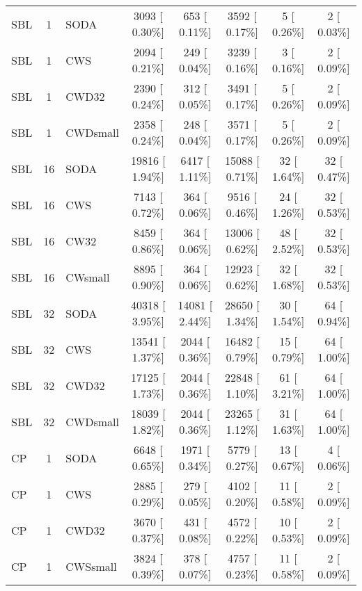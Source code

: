 \begin{table}
\begin{tabular*}{\textwidth}{ l c l c c c c c}
  \thickhline

SBL & 1 & SODA &   3093 [ 0.30\%] &    653 [ 0.11\%] &    3592 [ 0.17\%] &    5 [ 0.26\%] &   2 [ 0.03\%] \\
SBL & 1 & CWS &  2094 [ 0.21\%] &    249 [ 0.04\%] &    3239 [ 0.16\%] &    3 [ 0.16\%] &    2 [ 0.09\%] \\
SBL & 1 & CWD32 &  2390 [ 0.24\%] &    312 [ 0.05\%] &    3491 [ 0.17\%] &    5 [ 0.26\%] &    2 [ 0.09\%] \\
SBL & 1 & CWDsmall  & 2358 [ 0.24\%] &    248 [ 0.04\%] &    3571 [ 0.17\%] &    5 [ 0.26\%] &      2 [ 0.09\%] \\

  \hline

SBL & 16 & SODA & 19816 [ 1.94\%] &   6417 [ 1.11\%] &   15088 [ 0.71\%] &   32 [ 1.64\%] &     32 [ 0.47\%] \\
SBL & 16 & CWS &  7143 [ 0.72\%] &    364 [ 0.06\%] &    9516 [ 0.46\%] &   24 [ 1.26\%] &     32 [ 0.53\%] \\
SBL & 16 & CW32 &   8459 [ 0.86\%] &    364 [ 0.06\%] &   13006 [ 0.62\%] &   48 [ 2.52\%] &    32 [ 0.53\%] \\
SBL & 16 & CWsmall &  8895 [ 0.90\%] &    364 [ 0.06\%] &   12923 [ 0.62\%] &   32 [ 1.68\%] &  32 [ 0.53\%] \\

 \hline
SBL & 32 & SODA &   40318 [ 3.95\%] &  14081 [ 2.44\%] &   28650 [ 1.34\%] &   30 [ 1.54\%] &     64 [ 0.94\%] \\
SBL &  32 & CWS & 13541 [ 1.37\%] &   2044 [ 0.36\%] &   16482 [ 0.79\%] &   15 [ 0.79\%] &     64 [ 1.00\%] \\
SBL & 32 & CWD32 & 17125 [ 1.73\%] &   2044 [ 0.36\%] &   22848 [ 1.10\%] &   61 [ 3.21\%] &     64 [ 1.00\%] \\
SBL & 32 & CWDsmall &  18039 [ 1.82\%] &   2044 [ 0.36\%] &   23265 [ 1.12\%] &   31 [ 1.63\%] &      64 [ 1.00\%] \\

 \thickhline

CP & 1 & SODA &   6648 [ 0.65\%] &   1971 [ 0.34\%] &    5779 [ 0.27\%] &   13 [ 0.67\%] &      4 [ 0.06\%] \\
CP & 1 & CWS &  2885 [ 0.29\%] &    279 [ 0.05\%] &    4102 [ 0.20\%] &   11 [ 0.58\%] &      2 [ 0.09\%] \\
CP & 1 & CWD32 &  3670 [ 0.37\%] &    431 [ 0.08\%] &    4572 [ 0.22\%] &   10 [ 0.53\%] &     2 [ 0.09\%] \\
CP & 1 & CWSsmall &  3824 [ 0.39\%] &    378 [ 0.07\%] &    4757 [ 0.23\%] &   11 [ 0.58\%] &     2 [ 0.09\%] \\


\end{tabular*}
\end{table}
